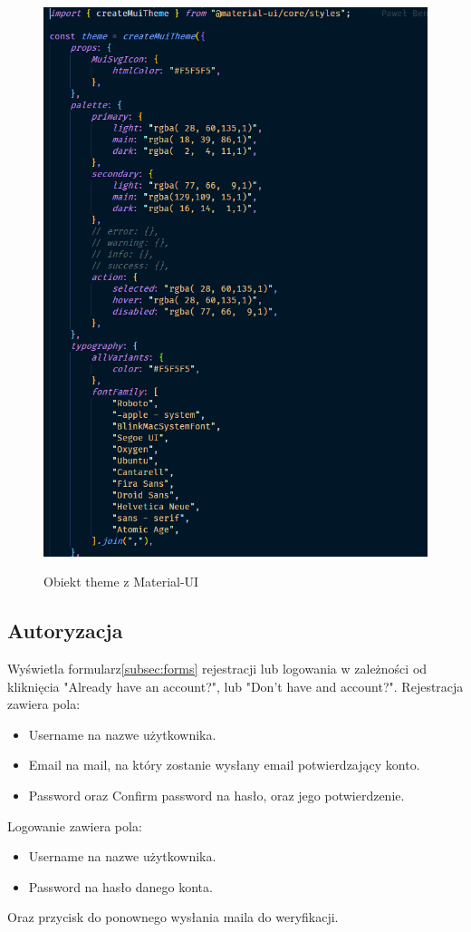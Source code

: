 \documentclass[a4paper,11pt]{report}
\begin{document}
\begin{figure}[H]
	\centering
	\includegraphics[scale=0.5]{implementacja/frontend/custom_theme}\\
	\caption{Obiekt theme z Material-UI}
	\label{fig:custom_theme}
\end{figure}

\subsection{Autoryzacja}
Wyświetla formularz\ref{subsec:forms} rejestracji lub logowania w zależności od kliknięcia "Already have an account?", lub "Don't have and account?".
Rejestracja zawiera pola:
\begin{itemize}
	\item Username na nazwe użytkownika.
	\item Email na mail, na który zostanie wysłany email potwierdzający konto.
	\item Password oraz Confirm password na hasło, oraz jego potwierdzenie.
\end{itemize}
Logowanie zawiera pola:
\begin{itemize}
	\item Username na nazwe użytkownika.
	\item Password na hasło danego konta.
\end{itemize}
Oraz przycisk do ponownego wysłania maila do weryfikacji.
\end{document}
